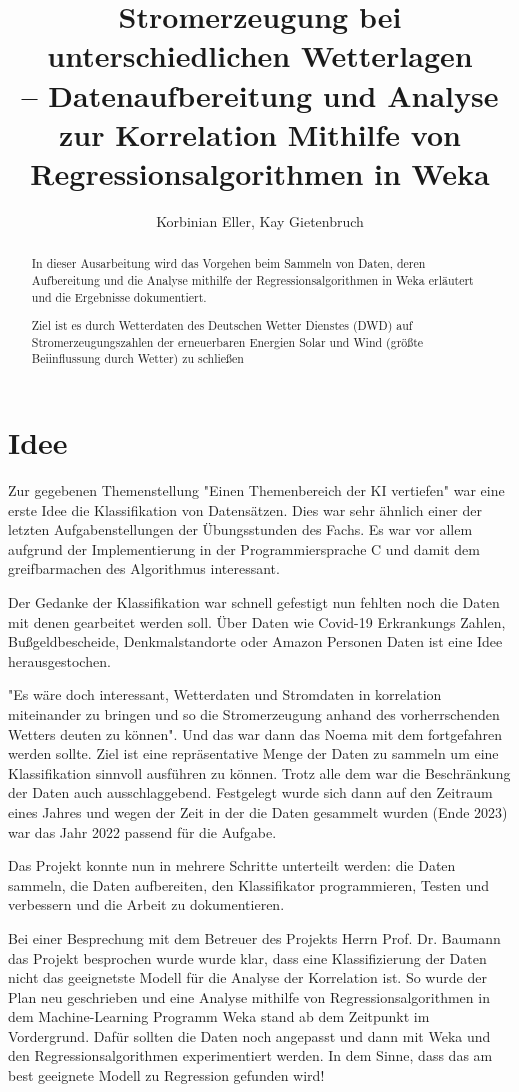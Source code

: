 \documentclass[letterpaper]{article} %
\title{Stromerzeugung bei unterschiedlichen Wetterlagen\\-- Datenaufbereitung und Analyse zur Korrelation Mithilfe von Regressionsalgorithmen in Weka}
\author {
    Korbinian Eller,
    Kay Gietenbruch
}
\begin{document}
\maketitle
\begin{abstract}
    In dieser Ausarbeitung wird das Vorgehen beim Sammeln von Daten, deren Aufbereitung und die Analyse mithilfe der Regressionsalgorithmen in Weka erläutert und die Ergebnisse dokumentiert.
    
    Ziel ist es durch Wetterdaten des Deutschen Wetter Dienstes (DWD) auf Stromerzeugungszahlen der erneuerbaren Energien Solar und Wind (größte Beiinflussung durch Wetter) zu schließen  
\end{abstract}
\section*{Idee}
    Zur gegebenen Themenstellung "Einen Themenbereich der KI vertiefen" war eine erste Idee die Klassifikation von Datensätzen.
    Dies war sehr ähnlich einer der letzten Aufgabenstellungen der Übungsstunden des Fachs.
    Es war vor allem aufgrund der Implementierung in der Programmiersprache C und damit dem greifbarmachen des Algorithmus interessant.

    Der Gedanke der Klassifikation war schnell gefestigt nun fehlten noch die Daten mit denen gearbeitet werden soll. Über Daten wie Covid-19 Erkrankungs Zahlen, Bußgeldbescheide, Denkmalstandorte oder Amazon Personen Daten ist eine Idee herausgestochen.

    "Es wäre doch interessant, Wetterdaten und Stromdaten in korrelation miteinander zu bringen und so die Stromerzeugung anhand des vorherrschenden Wetters deuten zu können". Und das war dann das Noema mit dem fortgefahren werden sollte. Ziel ist eine repräsentative Menge der Daten zu sammeln um eine Klassifikation sinnvoll ausführen zu können. Trotz alle dem war die Beschränkung der Daten auch ausschlaggebend. Festgelegt wurde sich dann auf den Zeitraum eines Jahres und wegen der Zeit in der die Daten gesammelt wurden (Ende 2023) war das Jahr 2022 passend für die Aufgabe.
    
    Das Projekt konnte nun in mehrere Schritte unterteilt werden: die Daten sammeln, die Daten aufbereiten, den Klassifikator programmieren, Testen und verbessern und die Arbeit zu dokumentieren.

    Bei einer Besprechung mit dem Betreuer des Projekts Herrn Prof. Dr. Baumann das Projekt besprochen wurde wurde klar, dass eine Klassifizierung der Daten nicht das geeignetste Modell für die Analyse der 
    Korrelation ist. So wurde der Plan neu geschrieben und eine Analyse mithilfe von Regressionsalgorithmen in dem Machine-Learning Programm Weka stand ab dem Zeitpunkt im Vordergrund.
    Dafür sollten die Daten noch angepasst und dann mit Weka und den Regressionsalgorithmen experimentiert werden. In dem Sinne, dass das am best geeignete Modell zu Regression gefunden wird!
\end{document}
